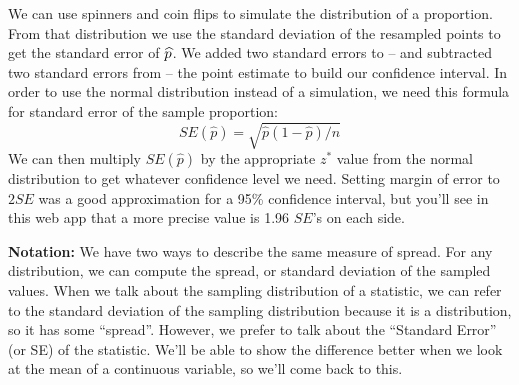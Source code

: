  

      
  
We can use spinners and coin flips to simulate the distribution
of a proportion.  From that distribution we use the standard
deviation of the resampled points to get the standard error of
$\widehat{p}$.  We added two standard errors 
to -- and subtracted two standard errors from -- the point estimate to build our
confidence interval.  In order to use the normal distribution instead of a
simulation,  we need this formula for standard error of the sample
proportion: 
    $$ SE(\widehat{p}) = \sqrt{\widehat{p}(1-\widehat{p})/n} $$
 We can then multiply $SE(\widehat{p})$ by the appropriate $z^*$
 value from the normal distribution to get whatever confidence
 level we need.  Setting margin of error to $2 SE$ was a good
 approximation for a 95\% confidence interval, but you'll see in
 this web app that a more precise value is 1.96 $SE$'s on each
 side.


{\bf Notation:} We have two ways to describe the same measure
of spread. For any distribution, we can compute the spread, or
standard deviation of the sampled values.  When we talk about the
sampling distribution of a statistic, we can  refer to the
standard deviation of the sampling distribution because it is a
distribution, so it has some ``spread''.   However, we prefer
to talk about the ``Standard Error'' (or SE) of the statistic.  We'll
be able to show the difference better when we look at the mean of a
continuous variable, so we'll come back to this. 

